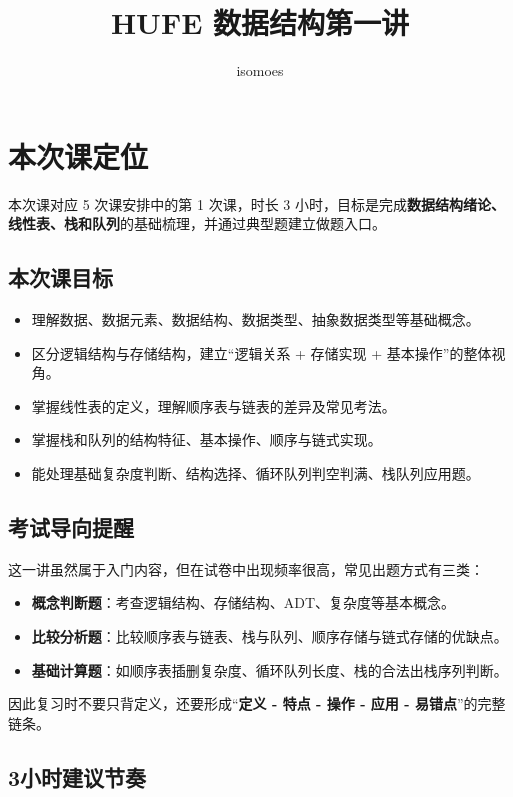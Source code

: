 \documentclass{../../note}
\title{HUFE 数据结构第一讲}
\author{isomoes}
\begin{document}
\maketitle

\section{本次课定位}

本次课对应 5 次课安排中的第 1 次课，时长 3 小时，目标是完成\textbf{数据结构绪论、线性表、栈和队列}的基础梳理，并通过典型题建立做题入口。

\subsection{本次课目标}

\begin{itemize}
  \item 理解数据、数据元素、数据结构、数据类型、抽象数据类型等基础概念。
  \item 区分逻辑结构与存储结构，建立“逻辑关系 + 存储实现 + 基本操作”的整体视角。
  \item 掌握线性表的定义，理解顺序表与链表的差异及常见考法。
  \item 掌握栈和队列的结构特征、基本操作、顺序与链式实现。
  \item 能处理基础复杂度判断、结构选择、循环队列判空判满、栈队列应用题。
\end{itemize}

\subsection{考试导向提醒}

这一讲虽然属于入门内容，但在试卷中出现频率很高，常见出题方式有三类：

\begin{itemize}
  \item \textbf{概念判断题}：考查逻辑结构、存储结构、ADT、复杂度等基本概念。
  \item \textbf{比较分析题}：比较顺序表与链表、栈与队列、顺序存储与链式存储的优缺点。
  \item \textbf{基础计算题}：如顺序表插删复杂度、循环队列长度、栈的合法出栈序列判断。
\end{itemize}

因此复习时不要只背定义，还要形成“\textbf{定义 - 特点 - 操作 - 应用 - 易错点}”的完整链条。

\subsection{3小时建议节奏}
\end{document}
